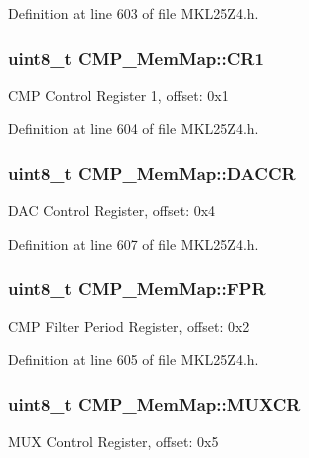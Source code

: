 Definition at line 603 of file M\+K\+L25\+Z4.\+h.

\subsubsection[{\texorpdfstring{C\+R1}{CR1}}]{\setlength{\rightskip}{0pt plus 5cm}uint8\+\_\+t C\+M\+P\+\_\+\+Mem\+Map\+::\+C\+R1}\hypertarget{struct_c_m_p___mem_map_ab790f5d18ef53ba0c9cfc2b5f3ce6668}{}\label{struct_c_m_p___mem_map_ab790f5d18ef53ba0c9cfc2b5f3ce6668}
C\+MP Control Register 1, offset\+: 0x1 

Definition at line 604 of file M\+K\+L25\+Z4.\+h.

\subsubsection[{\texorpdfstring{D\+A\+C\+CR}{DACCR}}]{\setlength{\rightskip}{0pt plus 5cm}uint8\+\_\+t C\+M\+P\+\_\+\+Mem\+Map\+::\+D\+A\+C\+CR}\hypertarget{struct_c_m_p___mem_map_a64ad86546fe53058b6fdd5ca1252f7c2}{}\label{struct_c_m_p___mem_map_a64ad86546fe53058b6fdd5ca1252f7c2}
D\+AC Control Register, offset\+: 0x4 

Definition at line 607 of file M\+K\+L25\+Z4.\+h.

\subsubsection[{\texorpdfstring{F\+PR}{FPR}}]{\setlength{\rightskip}{0pt plus 5cm}uint8\+\_\+t C\+M\+P\+\_\+\+Mem\+Map\+::\+F\+PR}\hypertarget{struct_c_m_p___mem_map_aa793447f43fa77759b6eaf1620bed4bc}{}\label{struct_c_m_p___mem_map_aa793447f43fa77759b6eaf1620bed4bc}
C\+MP Filter Period Register, offset\+: 0x2 

Definition at line 605 of file M\+K\+L25\+Z4.\+h.

\subsubsection[{\texorpdfstring{M\+U\+X\+CR}{MUXCR}}]{\setlength{\rightskip}{0pt plus 5cm}uint8\+\_\+t C\+M\+P\+\_\+\+Mem\+Map\+::\+M\+U\+X\+CR}\hypertarget{struct_c_m_p___mem_map_a3b48de300c4b4116ebb942659a2948a2}{}\label{struct_c_m_p___mem_map_a3b48de300c4b4116ebb942659a2948a2}
M\+UX Control Register, offset\+: 0x5 

